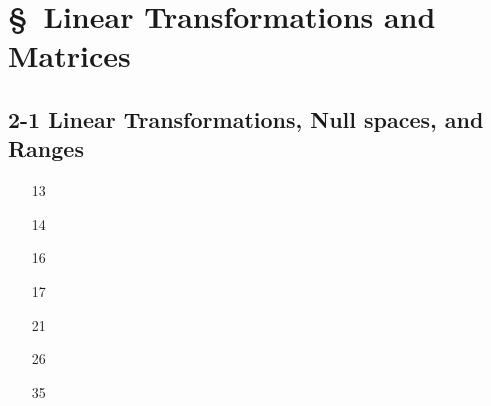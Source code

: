 


\cfoot{\thepage} %

\section*{\S \ Linear Transformations
and Matrices}
\subsection*{2-1 Linear Transformations, Null spaces, and Ranges} 
 
 \begin{enumerate}
   \item[13] 
   \newpage
   \item[14] 
   \item[16] 
   \item[17] 
   \item[21] 
   \item[26] 
   \item[35] 
   
 \end{enumerate}

